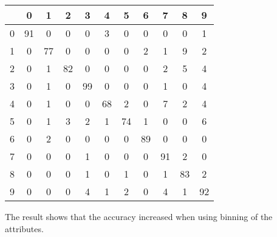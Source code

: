 \documentclass[11pt,letterpaper,oneside]{article}
\begin{document}
\begin{enumerate}
  \begin{tabular}{c|cccccccccc}
     & 0 & 1 & 2 & 3 & 4 & 5 & 6 & 7 & 8 & 9\\ \hline
   0 & 91&  0&  0&  0&  3&  0&  0&  0&  0&  1\\
   1 & 0& 77&  0&  0&  0&  0&  2&  1&  9&  2\\
   2 & 0&  1& 82&  0&  0&  0&  0&  2&  5&  4\\
   3 & 0&  1&  0& 99&  0&  0&  0&  1&  0&  4\\
   4 & 0&  1&  0&  0& 68&  2&  0&  7&  2&  4\\
   5 & 0&  1&  3&  2&  1& 74&  1&  0&  0&  6\\
   6 & 0&  2&  0&  0&  0&  0& 89&  0&  0&  0\\
   7 & 0&  0&  0&  1&  0&  0&  0& 91&  2&  0\\
   8 & 0&  0&  0&  1&  0&  1&  0&  1& 83&  2\\
   9 & 0&  0&  0&  4&  1&  2&  0&  4&  1& 92\\
  \end{tabular}

The result shows that the accuracy increased when using binning of the attributes.
\end{enumerate}
\end{document}
